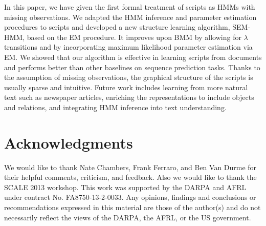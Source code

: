 \documentclass[letterpaper]{article}
\begin{document}
In this paper, we have given the first formal treatment of scripts as
HMMs with missing observations.
We adapted the HMM inference and parameter estimation procedures
to scripts and developed a new structure
learning algorithm, SEM-HMM, based on the EM procedure.
It improves upon BMM by allowing for $\lambda$ transitions and by
incorporating maximum likelihood parameter estimation via EM.
We showed that our algorithm is effective in learning scripts from
documents and performs better than
other baselines on sequence prediction tasks. Thanks to the
assumption of missing observations, the graphical
structure of the scripts is usually sparse and intuitive.
Future work includes learning from more natural text such as
newspaper articles, enriching the representations to include objects and
relations, and integrating HMM inference into text understanding.



\section*{Acknowledgments}
We would like to thank Nate Chambers, Frank Ferraro, and Ben Van Durme for their helpful comments, criticism, and feedback.  Also we would like to thank the SCALE 2013 workshop. This work was supported by the DARPA and AFRL under contract No. FA8750-13-2-0033. Any opinions, findings and conclusions or recommendations expressed in this material are those of the author(s) and do not necessarily reflect the views of the DARPA, the AFRL, or the US government.
\end{document}
